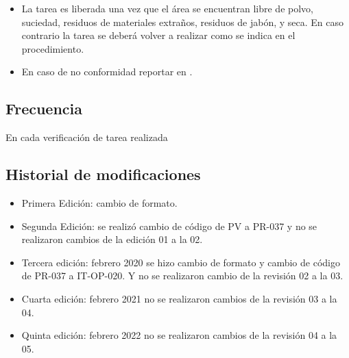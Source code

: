 \begin{itemize}
	\item La tarea es liberada una vez que el área se encuentran libre de polvo, suciedad, residuos de materiales extraños, residuos de jabón, y seca. En caso contrario la tarea se deberá volver a realizar como se indica en el procedimiento.
	\item En caso de no conformidad reportar en \RAC.
\end{itemize}

\subsection{Frecuencia}

En cada verificación de tarea realizada

\subsection{Historial de modificaciones}

\begin{itemize}
	\item Primera Edición: cambio de formato.
	\item Segunda Edición: se realizó cambio de código de PV a PR-037 y no se realizaron cambios de la edición 01 a la 02.
	\item Tercera edición: febrero 2020 se hizo cambio de formato y cambio de código de PR-037 a IT-OP-020. Y no se realizaron cambio de la revisión 02 a la 03.
	\item Cuarta edición: febrero 2021 no se realizaron cambios de la revisión 03 a la 04.
	\item Quinta edición: febrero 2022 no se realizaron cambios de la revisión 04 a la 05.
\end{itemize}
